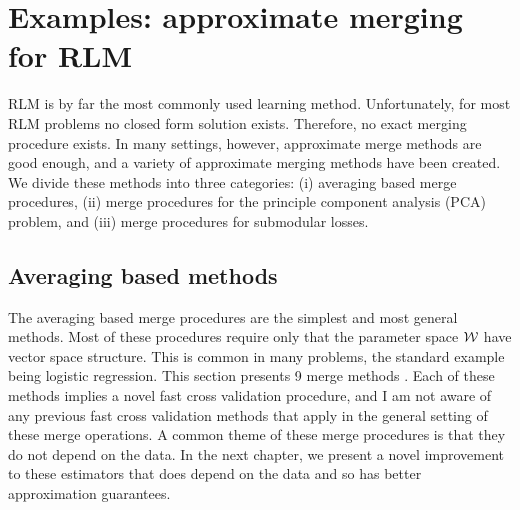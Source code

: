 \documentclass[thesis.tex]{subfiles}
\begin{document}
\section{Examples: approximate merging for RLM}
\label{sec:merge:approx}

RLM is by far the most commonly used learning method.
Unfortunately, for most RLM problems no closed form solution exists.
Therefore, no exact merging procedure exists. 
In many settings, however, approximate merge methods are good enough,
and a variety of approximate merging methods have been created.
We divide these methods into three categories:
(i) averaging based merge procedures,
(ii) merge procedures for the principle component analysis (PCA) problem,
and (iii) merge procedures for submodular losses.
%


\subsection{Averaging based methods}
\label{sec:merge:ave}
The averaging based merge procedures are the simplest and most general methods.
Most of these procedures require only that the parameter space ${\mathcal W}$ have vector space structure.
This is common in many problems,
the standard example being logistic regression.
This section presents 9 merge methods 
\citep{merugu2003privacy,mcdonald2009efficient,zinkevich2010parallelized,zhang2012communication,zhang2013divide,liu2014distributed,battey2015distributed,han2016bootstrap,jordan2016communication,lee2015communication}.
Each of these methods implies a novel fast cross validation procedure,
and I am not aware of any previous fast cross validation methods that apply in the general setting of these merge operations.
A common theme of these merge procedures is that they do not depend on the data.
In the next chapter, we present a novel improvement to these estimators that does depend on the data 
and so has better approximation guarantees.
\end{document}
